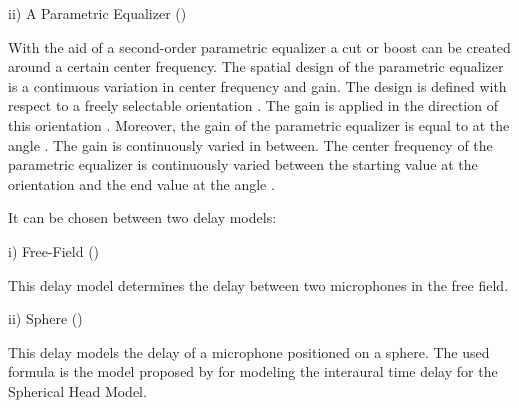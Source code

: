 


ii) A Parametric Equalizer ()

With the aid of a second-order parametric equalizer a cut or boost can be created around
a certain center frequency. The spatial design of the parametric equalizer is a continuous
variation in center frequency and gain. The design is defined with respect to a freely
selectable orientation .
The gain  is applied in the direction of this orientation .
Moreover, the gain of the parametric equalizer is equal to  at the angle
. The gain is continuously varied in between.
The center frequency of the parametric equalizer is continuously varied between the starting
value  at the orientation  and the end value
 at the angle .




It can be chosen between two delay models:

i) Free-Field ()

This delay model determines the delay between two microphones in the free field.

ii) Sphere ()

This delay models the delay of a microphone positioned on a sphere. The used formula is
the model proposed by \citet{BrownDuda} for modeling the interaural time delay for the
Spherical Head Model.


